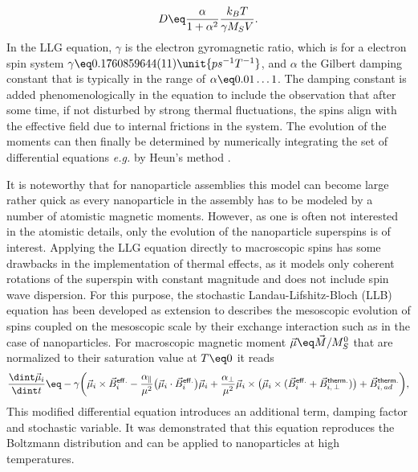 \documentclass[\main/dresen_thesis.tex]{subfiles}
\begin{document}
    \begin{align}
      D \eq \frac{\alpha}{1 + \alpha^2} \frac{k_B T}{\gamma M_S V}.
    \end{align}
    In the LLG equation, $\gamma$ is the electron gyromagnetic ratio, which is for a electron spin system $\gamma \eq 0.1760859644(11) \unit{ps^{-1} T^{-1}}$, and $\alpha$ the Gilbert damping constant that is typically in the range of $\alpha \eq 0.01 \ldots 1$.
    The damping constant is added phenomenologically in the equation to include the observation that after some time, if not disturbed by strong thermal fluctuations, the spins align with the effective field due to internal frictions in the system.
    The evolution of the moments can then finally be determined by numerically integrating the set of differential equations \textit{e.g.} by Heun's method \cite{Sueli_2003_Anint}.

    It is noteworthy that for nanoparticle assemblies this model can become large rather quick as every nanoparticle in the assembly has to be modeled by a number of atomistic magnetic moments.
    However, as one is often not interested in the atomistic details, only the evolution of the nanoparticle superspins is of interest.
    Applying the LLG equation directly to macroscopic spins has some drawbacks in the implementation of thermal effects, as it models only coherent rotations of the superspin with constant magnitude and does not include spin wave dispersion.
    For this purpose, the stochastic Landau-Lifshitz-Bloch (LLB) equation \cite{Evans_2012_Stoch, Atxitia_2017_Funda} has been developed as extension to describes the mesoscopic evolution of spins coupled on the mesoscopic scale by their exchange interaction such as in the case of nanoparticles. For macroscopic magnetic moment $\vec{\mu} \eq \vec{M} / M_S^0$ that are normalized to their saturation value at $T \eq 0$ it reads
    \begin{align}
      \frac{\dint \vec{\mu}_i}{\dint t} \eq
        - \gamma \biggl(
          \vec{\mu}_i \times \vec{B}_i^\mathsf{eff.} -
          \frac{\alpha_\parallel}{\mu^2} \bigl(\vec{\mu}_i \cdot \vec{B}_i^\mathsf{eff.} \bigr) \vec{\mu}_i +
          \frac{\alpha_\bot}{\mu^2} \vec{\mu}_i \times \bigl(\vec{\mu}_i \times (\vec{B}_i^\mathsf{eff.} + \vec{B}^\mathsf{therm.}_{i, \, \bot}) \bigr) +  \vec{B}^\mathsf{therm.}_{i, \, ad} \biggr),
    \end{align}
    This modified differential equation introduces an additional term, damping factor and stochastic variable.
    It was demonstrated that this equation reproduces the Boltzmann distribution and can be applied to nanoparticles at high temperatures.
\end{document}
